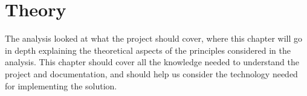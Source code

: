 \chapter{Theory}

The analysis looked at what the project should cover, where this chapter will go in depth explaining the theoretical aspects of the principles considered in the analysis.
This chapter should cover all the knowledge needed to understand the project and documentation, and should help us consider the technology needed for implementing the solution.






